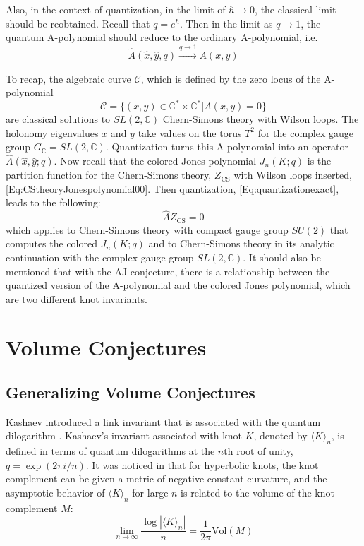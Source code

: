 \documentclass[a4paper,titlepage,twoside]{book}
\begin{document}
Also, in the context of quantization, in the limit of $\hbar \to 0$, the classical limit should be reobtained.  Recall that $q = e^{\hbar}$.  Then in the limit as $q\to 1$, the quantum A-polynomial should reduce to the ordinary A-polynomial, i.e.
\begin{equation}
\widehat{A}{(\widehat{x}, \widehat{y}, q)} \xrightarrow{ q \to 1 } A{(x,y)}
\end{equation}

To recap, the algebraic curve $\mathcal{C}$, which is defined by the zero locus of the A-polynomial
\begin{equation}
  \mathcal{C} = \lbrace ( x,y ) \in \mathbb{C}^* \times \mathbb{C}^* | A(x,y) = 0 \rbrace
\end{equation}
are classical solutions to $SL{(2,\mathbb{C})}$ Chern-Simons theory with Wilson loops.  The holonomy eigenvalues $x$ and $y$ take values on the torus $T^2$ for the complex gauge group $G_{\mathbb{C}} = SL{(2,\mathbb{C})}$.  Quantization turns this A-polynomial into an operator $\widehat{A}{(\widehat{x},\widehat{y};q)}$.  Now recall that the colored Jones polynomial $J_n{(K;q)}$ is the partition function for the Chern-Simons theory, $Z_{\text{CS}}$ with Wilson loops inserted, \eqref{Eq:CStheoryJonespolynomial00}.  Then quantization, \eqref{Eq:quantizationexact}, leads to the following:  
\begin{equation}
  \widehat{A}Z_{\text{CS}} = 0
\end{equation}
which applies to Chern-Simons theory with compact gauge group $SU(2)$ that computes the colored $J_n{(K;q)}$ and to Chern-Simons theory in its analytic continuation with the complex gauge group $SL{(2,\mathbb{C})}$.  It should also be mentioned that with the AJ conjecture, there is a relationship between the quantized version of the A-polynomial and the colored Jones polynomial, which are two different knot invariants.  

\section{Volume Conjectures}

\subsection{Generalizing Volume Conjectures }\label{subsec:GeneralizingVolumeConjectures}

Kashaev introduced a link invariant that is associated with the quantum dilogarithm \cite{Kashaev1996}.  Kashaev's invariant associated with knot $K$, denoted by $\langle K \rangle_n$, is defined in terms of quantum dilogarithms at the $n$th root of unity, $q = \exp{ (2\pi i /n)}$.  It was noticed in \cite{Kashaev1996} that for hyperbolic knots, the knot complement can be given a metric of negative constant curvature, and the asymptotic behavior of $\langle K \rangle_n$ for large $n$ is related to the volume of the knot complement $M$:
\begin{equation}
\lim_{n \to \infty} \frac{ \log{ |\langle K \rangle_n | } }{ n } = \frac{1}{2\pi } \text{Vol}{ (M)}
\label{Eq:KashaevVolConjecture}
\end{equation}
\end{document}
